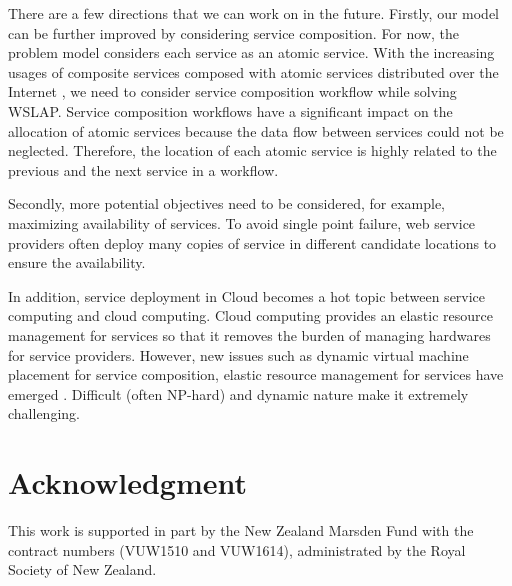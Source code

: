 \documentclass[10pt,journal,compsoc]{IEEEtran}
\begin{document}

There are a few directions that we can work on in the future. Firstly, our model can be further improved by considering service composition. For now, the problem model considers each service as an atomic service. With the increasing usages of composite services composed with atomic services distributed over the Internet \cite{6900416,Tan2017}, we need to consider service composition workflow while solving WSLAP.   Service composition workflows have a significant impact on the allocation of atomic services because the data flow between services could not be neglected. Therefore, the location of each atomic service is highly related to the previous and the next service in a workflow.

Secondly, more potential objectives need to be considered, for example, maximizing availability of services. To avoid single point failure, web service providers often deploy many copies of service in different candidate locations to ensure the availability. 

In addition, service deployment in Cloud becomes a hot topic between service computing and cloud computing. Cloud computing provides an elastic resource management for services so that it removes the burden of managing hardwares for service providers. However, new issues such as dynamic virtual machine placement for service composition, elastic resource management for services have emerged \cite{7969618}. Difficult (often NP-hard) and dynamic nature make it extremely challenging.




\section*{Acknowledgment}
This work is supported in part by the New Zealand Marsden Fund with the contract numbers (VUW1510 and VUW1614), administrated by the Royal Society of New Zealand.
\end{document}

